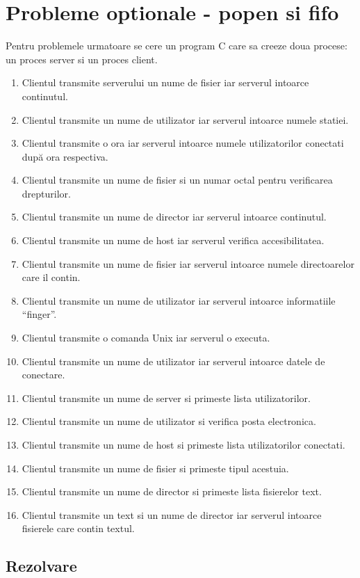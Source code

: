 \documentclass[11pt]{article}
\begin{document}
\section{Probleme optionale - popen si fifo}
\label{sec:orgb9b73ad}
Pentru problemele urmatoare se cere un program C care sa creeze doua procese: un proces server si un proces client.

\begin{enumerate}
\item Clientul transmite serverului un nume de fisier iar serverul intoarce continutul.
\item Clientul transmite un nume de utilizator iar serverul intoarce numele statiei.
\item Clientul transmite o ora iar serverul intoarce numele utilizatorilor conectati după ora respectiva.
\item Clientul transmite un nume de fisier si un numar octal pentru verificarea drepturilor.
\item Clientul transmite un nume de director iar serverul intoarce continutul.
\item Clientul transmite un nume de host iar serverul verifica accesibilitatea.
\item Clientul transmite un nume de fisier iar serverul intoarce numele directoarelor care il contin.
\item Clientul transmite un nume de utilizator iar serverul intoarce informatiile ``finger''.
\item Clientul transmite o comanda Unix iar serverul o executa.
\item Clientul transmite un nume de utilizator iar serverul intoarce datele de conectare.
\item Clientul transmite un nume de server si primeste lista utilizatorilor.
\item Clientul transmite un nume de utilizator si verifica posta electronica.
\item Clientul transmite un nume de host si primeste lista utilizatorilor conectati.
\item Clientul transmite un nume de fisier si primeste tipul acestuia.
\item Clientul transmite un nume de director si primeste lista fisierelor text.
\item Clientul transmite un text si un nume de director iar serverul intoarce fisierele care contin textul.
\end{enumerate}
\subsection{Rezolvare}
\label{sec:orga124054}
\end{document}
